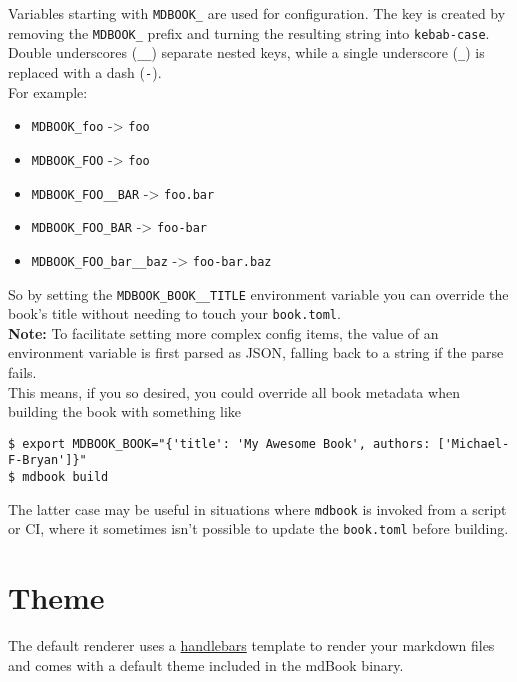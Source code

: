 \documentclass{article}
\begin{document}
Variables starting with \lstinline|MDBOOK_| are used for configuration. The key is created
by removing the \lstinline|MDBOOK_| prefix and turning the resulting string into
\lstinline|kebab-case|. Double underscores (\lstinline|__|) separate nested keys, while a single
underscore (\lstinline|_|) is replaced with a dash (\lstinline|-|).\\

For example:\\
\begin{itemize}
\item \lstinline|MDBOOK_foo| -> \lstinline|foo|
\item \lstinline|MDBOOK_FOO| -> \lstinline|foo|
\item \lstinline|MDBOOK_FOO__BAR| -> \lstinline|foo.bar|
\item \lstinline|MDBOOK_FOO_BAR| -> \lstinline|foo-bar|
\item \lstinline|MDBOOK_FOO_bar__baz| -> \lstinline|foo-bar.baz|
\end{itemize}

So by setting the \lstinline|MDBOOK_BOOK__TITLE| environment variable you can override the
book's title without needing to touch your \lstinline|book.toml|.\\

\textbf{Note:} To facilitate setting more complex config items, the value of an
environment variable is first parsed as JSON, falling back to a string if the
parse fails.\\

This means, if you so desired, you could override all book metadata when
building the book with something like\\
\begin{lstlisting}[language=shell]
$ export MDBOOK_BOOK="{'title': 'My Awesome Book', authors: ['Michael-F-Bryan']}"
$ mdbook build

\end{lstlisting}

The latter case may be useful in situations where \lstinline|mdbook| is invoked from a
script or CI, where it sometimes isn't possible to update the \lstinline|book.toml| before
building.\\

\section{Theme}
\label{Theme}
\label{theme}

The default renderer uses a \href{http://handlebarsjs.com/}{handlebars} template to
render your markdown files and comes with a default theme included in the mdBook
binary.\\
\end{document}
